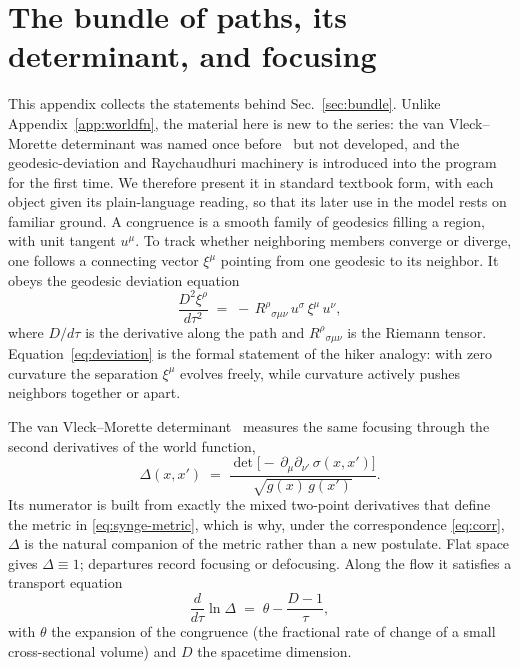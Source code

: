 \documentclass[%
 reprint, amsmath,amssymb, aps, prb, ]{revtex4-2}
\numberwithin{equation}{section}
\begin{document}
\section{The bundle of paths, its determinant, and focusing}
\label{app:congruence}

This appendix collects the statements behind Sec.~\ref{sec:bundle}. Unlike Appendix~\ref{app:worldfn}, the material here is new to the series: the van Vleck--Morette determinant was named once before~\cite{hanamura51} but not developed, and the geodesic-deviation and Raychaudhuri machinery is introduced into the program for the first time. We therefore present it in standard textbook form, with each object given its plain-language reading, so that its later use in the model rests on familiar ground. A congruence is a smooth family of geodesics filling a region, with unit tangent $u^\mu$. To track whether neighboring members converge or diverge, one follows a connecting vector $\xi^\mu$ pointing from one geodesic to its neighbor. It obeys the geodesic deviation equation
\begin{equation}
\frac{D^2 \xi^\rho}{d\tau^2} \;=\; -\,R^\rho{}_{\sigma\mu\nu}\,u^\sigma\,\xi^\mu\,u^\nu,
\label{eq:deviation}
\end{equation}
where $D/d\tau$ is the derivative along the path and $R^\rho{}_{\sigma\mu\nu}$ is the Riemann tensor. Equation~\eqref{eq:deviation} is the formal statement of the hiker analogy: with zero curvature the separation $\xi^\mu$ evolves freely, while curvature actively pushes neighbors together or apart.

The van Vleck--Morette determinant~\cite{VanVleck1928,Morette1951,Visser1993} measures the same focusing through the second derivatives of the world function,
\begin{equation}
\Delta(x,x') \;=\; \frac{\det\!\big[-\,\partial_\mu\partial_{\nu'}\,\sigma(x,x')\big]}{\sqrt{g(x)\,g(x')}}.
\label{eq:vvm-def}
\end{equation}
Its numerator is built from exactly the mixed two-point derivatives that define the metric in \eqref{eq:synge-metric}, which is why, under the correspondence \eqref{eq:corr}, $\Delta$ is the natural companion of the metric rather than a new postulate. Flat space gives $\Delta\equiv 1$; departures record focusing or defocusing. Along the flow it satisfies a transport equation
\begin{equation}
\frac{d}{d\tau}\ln\Delta \;=\; \theta - \frac{D-1}{\tau},
\label{eq:vvm-transport}
\end{equation}
with $\theta$ the expansion of the congruence (the fractional rate of change of a small cross-sectional volume) and $D$ the spacetime dimension.
\end{document}
